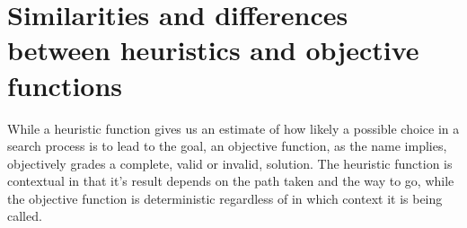 \section*{Similarities and differences between heuristics and objective functions}

While a heuristic function gives us an estimate of how likely a possible choice in a search process is to lead to the goal, an objective function, as the name implies, objectively grades a complete, valid or invalid, solution. 
The heuristic function is contextual in that it's result depends on the path taken and the way to go, while the objective function is deterministic regardless of in which context it is being called.
